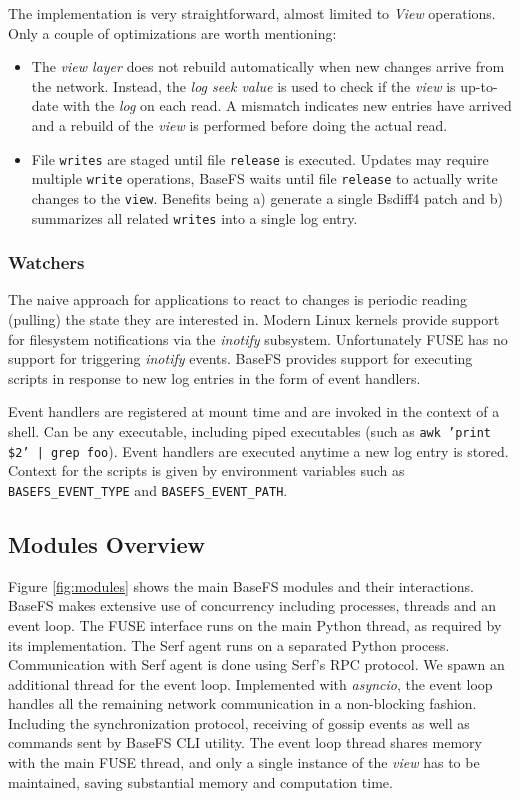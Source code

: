 \documentclass{sig-alternate}
\begin{document}
The implementation is very straightforward, almost limited to \textit{View} operations. Only a couple of optimizations are worth mentioning:

\begin{itemize}
 \item The \textit{view layer} does not rebuild automatically when new changes arrive from the network. Instead, the \textit{log seek value} is used to check if the \textit{view} is up-to-date with the \textit{log} on each read. A mismatch indicates new entries have arrived and a rebuild of the \textit{view} is performed before doing the actual read.
 \item File \texttt{writes} are staged until file \texttt{release} is executed. Updates may require multiple \texttt{write} operations, BaseFS waits until file \texttt{release} to actually write changes to the \texttt{view}. Benefits being a) generate a single Bsdiff4 patch and b) summarizes all related \texttt{writes} into a single log entry.
\end{itemize}


\subsubsection{Watchers}\label{watchers}
The naive approach for applications to react to changes is periodic reading (pulling) the state they are interested in. Modern Linux kernels provide support for filesystem notifications via the \textit{inotify} subsystem. Unfortunately FUSE has no support for triggering \textit{inotify} events. BaseFS provides support for executing scripts in response to new log entries in the form of event handlers.

Event handlers are registered at mount time and are invoked in the context of a shell. Can be any executable, including piped executables (such as \texttt{awk '{print \$2}' | grep foo}). Event handlers are executed anytime a new log entry is stored. Context for the scripts is given by environment variables such as \texttt{BASEFS\_EVENT\_TYPE} and \texttt{BASEFS\_EVENT\_PATH}.

\subsection{Modules Overview}\label{modules}

Figure \ref{fig:modules} shows the main BaseFS modules and their interactions. BaseFS makes extensive use of concurrency including processes, threads and an event loop. The FUSE interface runs on the main Python thread, as required by its implementation. The Serf agent runs on a separated Python process. Communication with Serf agent is done using Serf's RPC protocol. We spawn an additional thread for the event loop. Implemented with \textit{asyncio}, the event loop handles all the remaining network communication in a non-blocking fashion. Including the synchronization protocol, receiving of gossip events as well as commands sent by BaseFS CLI utility. The event loop thread shares memory with the main FUSE thread, and only a single instance of the \textit{view} has to be maintained, saving substantial memory and computation time.
\end{document}
